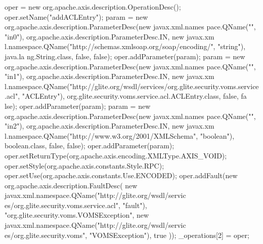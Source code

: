 \begin{DoxyCode}
{        oper = new org.apache.axis.description.OperationDesc();
        oper.setName("addACLEntry");
        param = new org.apache.axis.description.ParameterDesc(new javax.xml.names
      pace.QName("", "in0"), org.apache.axis.description.ParameterDesc.IN, new javax.xm
      l.namespace.QName("http://schemas.xmlsoap.org/soap/encoding/", "string"), java.la
      ng.String.class, false, false);
        oper.addParameter(param);
        param = new org.apache.axis.description.ParameterDesc(new javax.xml.names
      pace.QName("", "in1"), org.apache.axis.description.ParameterDesc.IN, new javax.xm
      l.namespace.QName("http://glite.org/wsdl/services/org.glite.security.voms.service
      .acl", "ACLEntry"), org.glite.security.voms.service.acl.ACLEntry.class, false, fa
      lse);
        oper.addParameter(param);
        param = new org.apache.axis.description.ParameterDesc(new javax.xml.names
      pace.QName("", "in2"), org.apache.axis.description.ParameterDesc.IN, new javax.xm
      l.namespace.QName("http://www.w3.org/2001/XMLSchema", "boolean"), boolean.class, 
      false, false);
        oper.addParameter(param);
        oper.setReturnType(org.apache.axis.encoding.XMLType.AXIS_VOID);
        oper.setStyle(org.apache.axis.constants.Style.RPC);
        oper.setUse(org.apache.axis.constants.Use.ENCODED);
        oper.addFault(new org.apache.axis.description.FaultDesc(
                      new javax.xml.namespace.QName("http://glite.org/wsdl/servic
      es/org.glite.security.voms.service.acl", "fault"),
                      "org.glite.security.voms.VOMSException",
                      new javax.xml.namespace.QName("http://glite.org/wsdl/servic
      es/org.glite.security.voms", "VOMSException"), 
                      true
                     ));
        _operations[2] = oper;

}
\end{DoxyCode}
